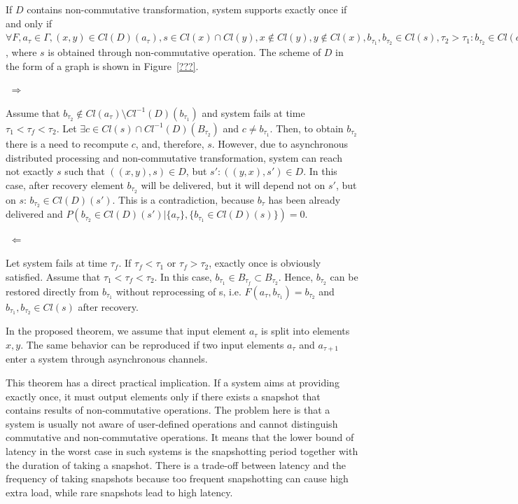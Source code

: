 \begin{theorem}
\label{necessary_conditions}
If $D$ contains non-commutative transformation, system supports exactly once if and only if $\forall F, a_\tau \in \Gamma, (x,y)\in Cl(D)(a_\tau), s\in Cl(x) \cap Cl(y), x\notin Cl(y), y\notin Cl(x), b_{\tau_1}, b_{\tau_2} \in Cl(s), \tau_2 > \tau_1 : b_{\tau_2} \in Cl(a_\tau) \setminus Cl^{-1}(D)(b_{\tau_1})$, where $s$ is obtained through non-commutative operation. The scheme of $D$ in the form of a graph is shown in Figure~\ref{???}. 
\end{theorem}
\begin{sketch}
$ $\newline
$\Rightarrow$

Assume that $b_{\tau_2} \notin Cl(a_\tau) \setminus Cl^{-1}(D)(b_{\tau_1})$ and system fails at time $\tau_1<\tau_f<\tau_2$. Let $\exists c \in Cl(s) \cap Cl^{-1}(D)(B_{\tau_2})$ and $c\neq b_{\tau_1}$. Then, to obtain $b_{\tau_2}$ there is a need to recompute $c$, and, therefore, $s$. However, due to asynchronous distributed processing and non-commutative transformation, system can reach not exactly $s$ such that $((x,y), s) \in D$, but $s':((y,x),s')\in D$. In this case, after recovery element $b_{\tau_2}$ will be delivered, but it will depend not on $s'$, but on $s$: $b_{\tau_2}\in Cl(D)(s')$. This is a contradiction, because $b_\tau$ has been already delivered and $P(b_{\tau_2}\in Cl(D)(s')|\{a_\tau\},\{b_{\tau_1} \in Cl(D)(s) \})=0$.

$ $\newline
$\Leftarrow$

Let system fails at time $\tau_f$. If $\tau_f < \tau_1$ or $\tau_f > \tau_2$, exactly once is obviously satisfied. Assume that $\tau_1<\tau_f<\tau_2$. In this case, $b_{\tau_1}\in B_{\tau_f}\subset B_{\tau_2}$. Hence, $b_{\tau_2}$ can be restored directly from $b_{\tau_1}$ without reprocessing of s, i.e. $F(a_\tau,b_{\tau_1})=b_{\tau_2}$ and $b_{\tau_1}, b_{\tau_2} \in Cl(s)$ after recovery.
\end{sketch}

In the proposed theorem, we assume that input element $a_\tau$ is split into elements $x,y$. The same behavior can be reproduced if two input elements $a_\tau$ and $a_{\tau+1}$ enter a system through asynchronous channels.

This theorem has a direct practical implication. If a system aims at providing exactly once, it must output elements only if there exists a snapshot that contains results of non-commutative operations. The problem here is that a system is usually not aware of user-defined operations and cannot distinguish commutative and non-commutative operations. It means that the lower bound of latency in the worst case in such systems is the snapshotting period together with the duration of taking a snapshot. There is a trade-off between latency and the frequency of taking snapshots because too frequent snapshotting can cause high extra load, while rare snapshots lead to high latency.

